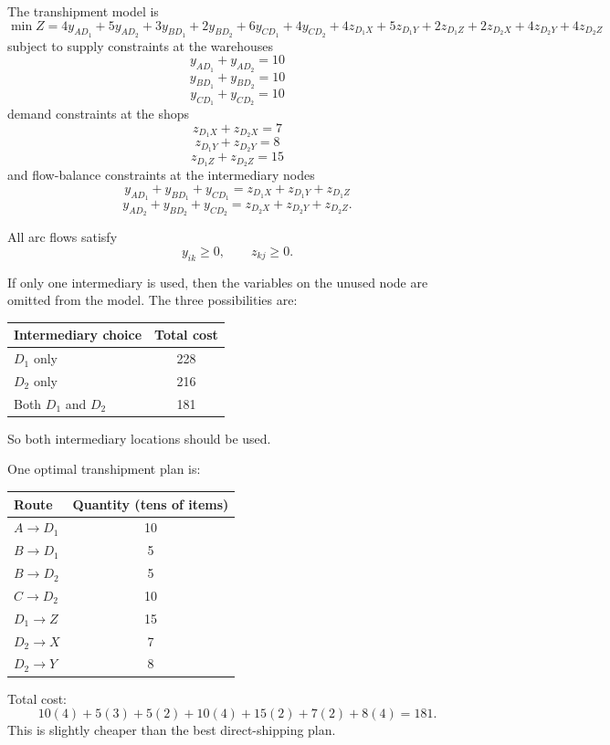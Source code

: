 \documentclass[11pt,a4paper]{article}
\begin{document}
\begin{enumerate}
The transhipment model is
\[
\min Z =
4y_{AD_1}+5y_{AD_2}
+3y_{BD_1}+2y_{BD_2}
+6y_{CD_1}+4y_{CD_2}
+4z_{D_1X}+5z_{D_1Y}+2z_{D_1Z}
+2z_{D_2X}+4z_{D_2Y}+4z_{D_2Z}
\]
subject to supply constraints at the warehouses
\[
y_{AD_1}+y_{AD_2}=10
\]
\[
y_{BD_1}+y_{BD_2}=10
\]
\[
y_{CD_1}+y_{CD_2}=10
\]
demand constraints at the shops
\[
z_{D_1X}+z_{D_2X}=7
\]
\[
z_{D_1Y}+z_{D_2Y}=8
\]
\[
z_{D_1Z}+z_{D_2Z}=15
\]
and flow-balance constraints at the intermediary nodes
\[
y_{AD_1}+y_{BD_1}+y_{CD_1}=z_{D_1X}+z_{D_1Y}+z_{D_1Z}
\]
\[
y_{AD_2}+y_{BD_2}+y_{CD_2}=z_{D_2X}+z_{D_2Y}+z_{D_2Z}.
\]

All arc flows satisfy
\[
y_{ik}\ge 0, \qquad z_{kj}\ge 0.
\]

If only one intermediary is used, then the variables on the unused node are omitted from the model.
The three possibilities are:

\begin{center}
\begin{tabular}{lc}
\toprule
Intermediary choice & Total cost \\
\midrule
$D_1$ only & 228 \\
$D_2$ only & 216 \\
Both $D_1$ and $D_2$ & 181 \\
\bottomrule
\end{tabular}
\end{center}

So both intermediary locations should be used.

One optimal transhipment plan is:

\begin{center}
\begin{tabular}{lc}
\toprule
Route & Quantity (tens of items) \\
\midrule
$A \to D_1$ & 10 \\
$B \to D_1$ & 5 \\
$B \to D_2$ & 5 \\
$C \to D_2$ & 10 \\
$D_1 \to Z$ & 15 \\
$D_2 \to X$ & 7 \\
$D_2 \to Y$ & 8 \\
\bottomrule
\end{tabular}
\end{center}

Total cost:
\[
10(4)+5(3)+5(2)+10(4)+15(2)+7(2)+8(4)=181.
\]
This is slightly cheaper than the best direct-shipping plan.
\end{enumerate}
\end{document}

